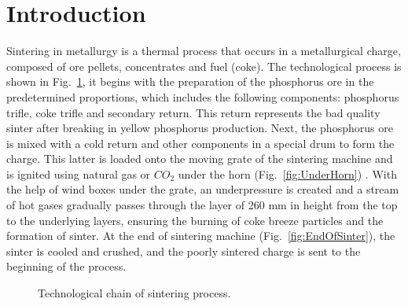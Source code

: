 \documentclass[AMS,STIX2COL]{WileyNJD-v2}
\begin{document}


\section{Introduction}\label{sec1}
Sintering in metallurgy is a thermal process that occurs in a metallurgical charge, composed of ore pellets, concentrates and fuel (coke). The technological process is shown in Fig.~\ref{fig:SinterProcess}, it begins with the preparation of the phosphorus ore in the predetermined proportions, which includes the following components: phosphorus trifle, coke trifle and secondary return. This return represents the bad quality sinter after breaking in yellow phosphorus production. Next, the phosphorus ore is mixed with a cold return and other components in a special drum to form the charge. This latter is loaded onto the moving grate of the sintering machine and is ignited using natural gas or $CO_2$ under the horn (Fig.~\ref{fig:UnderHorn}) . With the help of wind boxes under the grate, an underpressure is created and a stream of hot gases gradually passes through the layer of 260 mm in height from the top to the underlying layers, ensuring the burning of coke breeze particles and the formation of sinter. At the end of sintering machine (Fig.~\ref{fig:EndOfSinter}), the sinter is cooled and crushed, and the poorly sintered charge is sent to the beginning of the process. 

\begin{figure}[htbp]
	\centering
	\caption{Technological chain of sintering process.} \label{fig:SinterProcess}
\end{figure}
\end{document}
